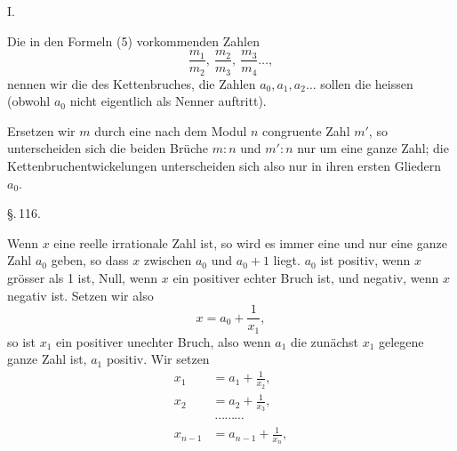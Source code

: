 

I. 

Die in den Formeln (5) vorkommenden Zahlen
\[
\frac{m_1}{m_2}, \ \frac{m_2}{m_3}, \ \frac{m_3}{m_4} \ldots,
\]
nennen wir die  des Kettenbruches, die Zahlen $a_0, a_1, a_2 \ldots$ sollen die  heissen (obwohl $a_0$ nicht eigentlich als Nenner auftritt).

Ersetzen wir $m$ durch eine nach dem Modul $n$ congruente Zahl $m'$, so unterscheiden sich die beiden Br\"uche $m:n$ und $m':n$ nur um eine ganze Zahl; die Kettenbruchentwickelungen unterscheiden sich also nur in ihren ersten Gliedern $a_0$.

\begin{center}
\S.\,116.

\end{center}

Wenn $x$ eine reelle irrationale Zahl ist, so wird es immer eine und nur eine ganze Zahl $a_0$ geben, so dass $x$ zwischen $a_0$ und $a_0 + 1$ liegt. $a_0$ ist positiv, wenn $x$ gr\"osser als 1 ist, Null, wenn $x$ ein positiver echter Bruch ist, und negativ, wenn $x$ negativ ist. Setzen wir also
\[
x = a_0 + \frac{1}{x_1},
\]
so ist $x_1$ ein positiver unechter Bruch, also wenn $a_1$ die zun\"achst  $x_1$ gelegene ganze Zahl ist, $a_1$ positiv. Wir setzen
\[
\begin{aligned}
x_1 &= a_1 + \frac{1}{x_2}, \\
x_2 &= a_2 + \frac{1}{x_3}, \\
&\ \cdots\cdots\cdots \\
x_{n-1} &= a_{n-1} + \frac{1}{x_n},
\end{aligned}
\]
